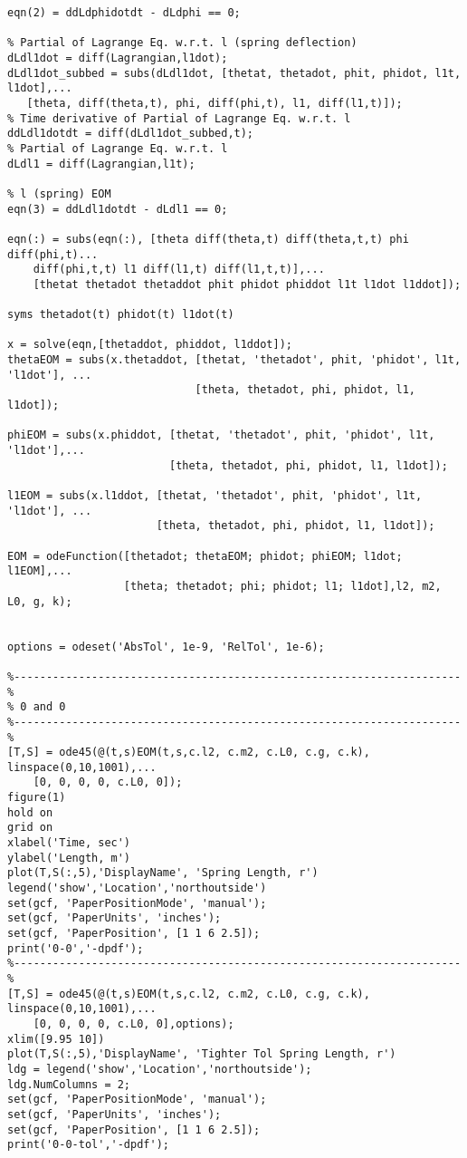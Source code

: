 \begin{lstlisting}[frame=lines,style=Matlab-editor,basicstyle = \mlttfamily]
% Phi EOM
eqn(2) = ddLdphidotdt - dLdphi == 0;

% Partial of Lagrange Eq. w.r.t. l (spring deflection)
dLdl1dot = diff(Lagrangian,l1dot);
dLdl1dot_subbed = subs(dLdl1dot, [thetat, thetadot, phit, phidot, l1t, l1dot],...
   [theta, diff(theta,t), phi, diff(phi,t), l1, diff(l1,t)]);
% Time derivative of Partial of Lagrange Eq. w.r.t. l
ddLdl1dotdt = diff(dLdl1dot_subbed,t);
% Partial of Lagrange Eq. w.r.t. l
dLdl1 = diff(Lagrangian,l1t);

% l (spring) EOM
eqn(3) = ddLdl1dotdt - dLdl1 == 0;

eqn(:) = subs(eqn(:), [theta diff(theta,t) diff(theta,t,t) phi diff(phi,t)...
    diff(phi,t,t) l1 diff(l1,t) diff(l1,t,t)],...
    [thetat thetadot thetaddot phit phidot phiddot l1t l1dot l1ddot]);

syms thetadot(t) phidot(t) l1dot(t)

x = solve(eqn,[thetaddot, phiddot, l1ddot]);
thetaEOM = subs(x.thetaddot, [thetat, 'thetadot', phit, 'phidot', l1t, 'l1dot'], ...
                             [theta, thetadot, phi, phidot, l1, l1dot]);

phiEOM = subs(x.phiddot, [thetat, 'thetadot', phit, 'phidot', l1t, 'l1dot'],...
                         [theta, thetadot, phi, phidot, l1, l1dot]);

l1EOM = subs(x.l1ddot, [thetat, 'thetadot', phit, 'phidot', l1t, 'l1dot'], ...
                       [theta, thetadot, phi, phidot, l1, l1dot]);

EOM = odeFunction([thetadot; thetaEOM; phidot; phiEOM; l1dot; l1EOM],...
                  [theta; thetadot; phi; phidot; l1; l1dot],l2, m2, L0, g, k);


options = odeset('AbsTol', 1e-9, 'RelTol', 1e-6);

%---------------------------------------------------------------------%
% 0 and 0
%---------------------------------------------------------------------%
[T,S] = ode45(@(t,s)EOM(t,s,c.l2, c.m2, c.L0, c.g, c.k), linspace(0,10,1001),...
    [0, 0, 0, 0, c.L0, 0]);
figure(1)
hold on
grid on
xlabel('Time, sec')
ylabel('Length, m')
plot(T,S(:,5),'DisplayName', 'Spring Length, r')
legend('show','Location','northoutside')
set(gcf, 'PaperPositionMode', 'manual');
set(gcf, 'PaperUnits', 'inches');
set(gcf, 'PaperPosition', [1 1 6 2.5]);
print('0-0','-dpdf');
%---------------------------------------------------------------------%
[T,S] = ode45(@(t,s)EOM(t,s,c.l2, c.m2, c.L0, c.g, c.k), linspace(0,10,1001),...
    [0, 0, 0, 0, c.L0, 0],options);
xlim([9.95 10])
plot(T,S(:,5),'DisplayName', 'Tighter Tol Spring Length, r')
ldg = legend('show','Location','northoutside');
ldg.NumColumns = 2;
set(gcf, 'PaperPositionMode', 'manual');
set(gcf, 'PaperUnits', 'inches');
set(gcf, 'PaperPosition', [1 1 6 2.5]);
print('0-0-tol','-dpdf');


\end{lstlisting}
